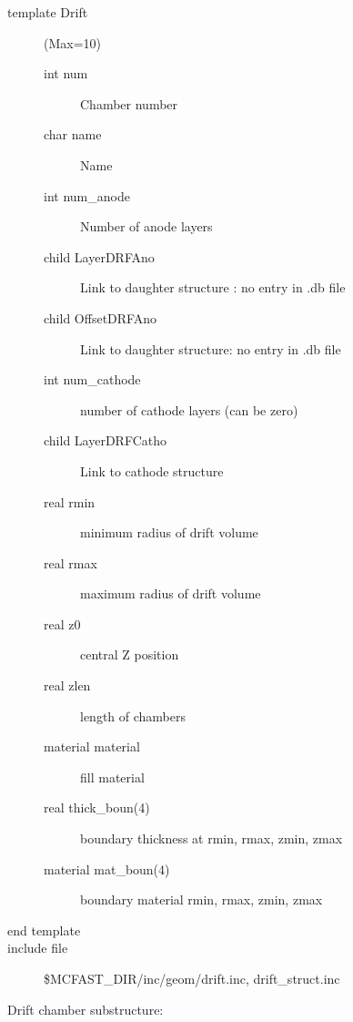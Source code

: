 \begin{description}
\item[{\rm template} Drift](Max=10)
\begin{description}
\item[{\rm  int} num]    Chamber number
\item[{\rm  char} name]  Name
\item[{\rm  int} num\_anode]  Number of anode layers
\item[{\rm  child} LayerDRFAno] Link to daughter structure  : no entry in .db file
\item[{\rm  child} OffsetDRFAno]  Link to daughter structure: no entry in .db file
\item[{\rm  int} num\_cathode]  number of cathode layers  (can be zero)
\item[{\rm  child} LayerDRFCatho]  Link to cathode structure
\item[{\rm  real} rmin]   minimum radius of drift volume
\item[{\rm  real} rmax]   maximum radius of drift volume
\item[{\rm  real} z0]     central Z position
\item[{\rm  real} zlen]   length of chambers
\item[{\rm  material} material]  fill material 
\item[{\rm  real} thick\_boun(4)]  boundary thickness at rmin, rmax, zmin, zmax
\item[{\rm  material} mat\_boun(4)]  boundary material rmin, rmax, zmin, zmax
\end{description}
\item[end template]
\item[include file] \$MCFAST\_DIR/inc/geom/drift.inc, drift\_struct.inc
\end{description}
Drift chamber substructure:
